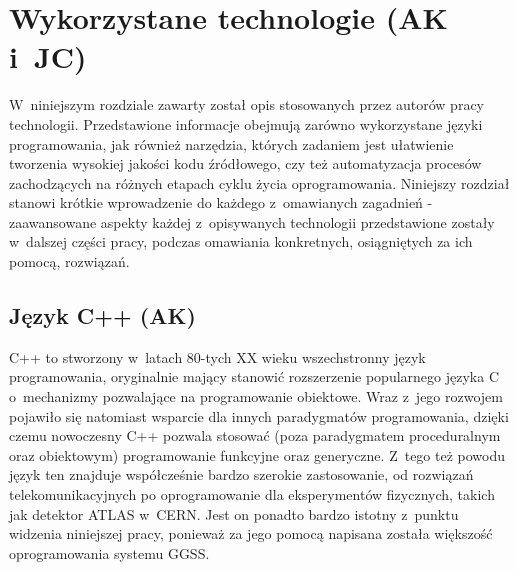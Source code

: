 \chapter{Wykorzystane technologie (AK i~JC)}
\label{ch:technologies}

\graphicspath{{2_technologies/static/}}

W~niniejszym rozdziale zawarty został opis stosowanych przez autorów pracy technologii. Przedstawione informacje obejmują zarówno wykorzystane języki programowania, jak również narzędzia, których zadaniem jest ułatwienie tworzenia wysokiej jakości kodu źródłowego, czy też automatyzacja procesów zachodzących na różnych etapach cyklu życia oprogramowania. Niniejszy rozdział stanowi krótkie wprowadzenie do każdego z~omawianych zagadnień - zaawansowane aspekty każdej z~opisywanych technologii przedstawione zostały w~dalszej części pracy, podczas omawiania konkretnych, osiągniętych za ich pomocą, rozwiązań. 


\section{Język C++ (AK)}
C++ \cite{Bjarne} \cite{cpp_reference} to stworzony w~latach 80-tych XX wieku wszechstronny język programowania, oryginalnie mający stanowić rozszerzenie popularnego języka C~\cite{c_book} o~mechanizmy pozwalające na programowanie obiektowe. Wraz z~jego rozwojem pojawiło się natomiast wsparcie dla innych paradygmatów programowania, dzięki czemu nowoczesny C++ pozwala stosować (poza paradygmatem proceduralnym oraz obiektowym) programowanie funkcyjne oraz generyczne. Z~tego też powodu język ten znajduje współcześnie bardzo szerokie zastosowanie, od rozwiązań telekomunikacyjnych po oprogramowanie dla eksperymentów fizycznych, takich jak detektor ATLAS w~CERN. Jest on ponadto bardzo istotny z~punktu widzenia niniejszej pracy, ponieważ za jego pomocą napisana została większość oprogramowania systemu GGSS.

